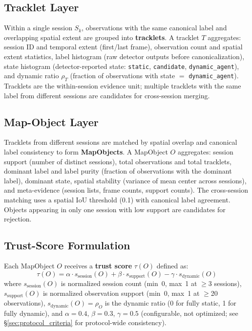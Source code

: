 \documentclass[journal]{IEEEtran}
\begin{document}
\subsection{Tracklet Layer}
\label{sec:tracklet}

Within a single session $S_k$, observations with the same canonical label and overlapping spatial extent are grouped into \textbf{tracklets}. A tracklet $T$ aggregates: session ID and temporal extent (first/last frame), observation count and spatial extent statistics, label histogram (raw detector outputs before canonicalization), state histogram (detector-reported state: \texttt{static}, \texttt{candidate}, \texttt{dynamic\_agent}), and dynamic ratio $\rho_T$ (fraction of observations with state $=$ \texttt{dynamic\_agent}). Tracklets are the within-session evidence unit; multiple tracklets with the same label from different sessions are candidates for cross-session merging.

\subsection{Map-Object Layer}
\label{sec:map_object}

Tracklets from different sessions are matched by spatial overlap and canonical label consistency to form \textbf{MapObjects}. A MapObject $O$ aggregates: session support (number of distinct sessions), total observations and total tracklets, dominant label and label purity (fraction of observations with the dominant label), dominant state, spatial stability (variance of mean center across sessions), and meta-evidence (session lists, frame counts, support counts). The cross-session matching uses a spatial IoU threshold (0.1) with canonical label agreement. Objects appearing in only one session with low support are candidates for rejection.

\subsection{Trust-Score Formulation}
\label{sec:trust_score}

Each MapObject $O$ receives a \textbf{trust score} $\tau(O)$ defined as:
\begin{equation}
\tau(O) = \alpha \cdot s_{\text{session}}(O) + \beta \cdot s_{\text{support}}(O) - \gamma \cdot s_{\text{dynamic}}(O)
\label{eq:trust_score}
\end{equation}
where $s_{\text{session}}(O)$ is normalized session count (min~0, max~1 at $\geq$3 sessions), $s_{\text{support}}(O)$ is normalized observation support (min~0, max~1 at $\geq$20 observations), $s_{\text{dynamic}}(O) = \rho_O$ is the dynamic ratio (0 for fully static, 1 for fully dynamic), and $\alpha = 0.4$, $\beta = 0.3$, $\gamma = 0.5$ (configurable, not optimized; see \S\ref{sec:protocol_criteria} for protocol-wide consistency).
\end{document}
